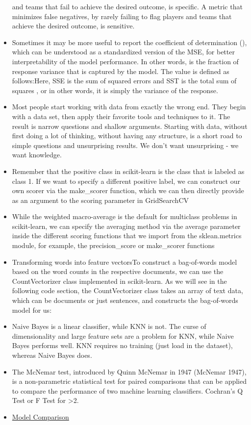 \documentclass[]{book}
\begin{document}
\begin{itemize}
  and teams that fail to achieve the desired outcome, is specific. A
  metric that minimizes false negatives, by rarely failing to flag
  players and teams that achieve the desired outcome, is sensitive.
\item
  Sometimes it may be more useful to report the coefficient of
  determination (), which can be understood as a standardized version of
  the MSE, for better interpretability of the model performance. In
  other words, is the fraction of response variance that is captured by
  the model. The value is defined as follows:Here, SSE is the sum of
  squared errors and SST is the total sum of squares , or in other
  words, it is simply the variance of the response.
\item
  Most people start working with data from exactly the wrong end. They
  begin with a data set, then apply their favorite tools and techniques
  to it. The result is narrow questions and shallow arguments. Starting
  with data, without first doing a lot of thinking, without having any
  structure, is a short road to simple questions and unsurprising
  results. We don't want unsurprising - we want knowledge.
\item
  Remember that the positive class in scikit-learn is the class that is
  labeled as class 1. If we want to specify a different positive label,
  we can construct our own scorer via the make\_scorer function, which
  we can then directly provide as an argument to the scoring parameter
  in GridSearchCV
\item
  While the weighted macro-average is the default for multiclass
  problems in scikit-learn, we can specify the averaging method via the
  average parameter inside the different scoring functions that we
  import from the sklean.metrics module, for example, the
  precision\_score or make\_scorer functions
\item
  Transforming words into feature vectorsTo construct a bag-of-words
  model based on the word counts in the respective documents, we can use
  the CountVectorizer class implemented in scikit-learn. As we will see
  in the following code section, the CountVectorizer class takes an
  array of text data, which can be documents or just sentences, and
  constructs the bag-of-words model for us:
\item
  Naive Bayes is a linear classifier, while KNN is not. The curse of
  dimensionality and large feature sets are a problem for KNN, while
  Naive Bayes performs well. KNN requires no training (just load in the
  dataset), whereas Naive Bayes does.
\item
  The McNemar test, introduced by Quinn McNemar in 1947 (McNemar 1947),
  is a non-parametric statistical test for paired comparisons that can
  be applied to compare the performance of two machine learning
  classifiers. Cochran's Q Test or F Test for \textgreater{}2.
\item
  \href{http://hunch.net/?p=224}{Model Comparison}
\end{itemize}
\end{document}
